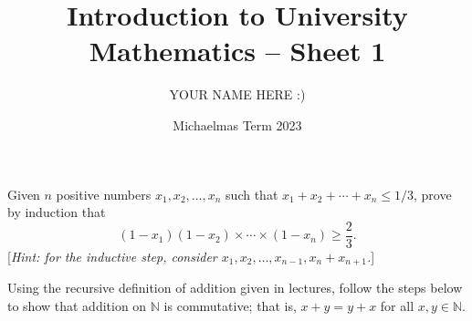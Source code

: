 \documentclass[answers]{exam}
\title{Introduction to University Mathematics -- Sheet 1}
\author{YOUR NAME HERE :)}
\date{Michaelmas Term 2023}
\begin{document}
\maketitle
\begin{questions}

\question%
Given $n$ positive numbers $x_{1}, x_{2}, \ldots, x_{n}$ such that $x_{1}+x_{2}+\cdots+x_{n} \leqslant 1 / 3$, prove by induction that \[
	(1-x_1)(1-x_2)\times\cdots\times(1-x_n)\geqslant\frac23.
\] [\emph{Hint: for the inductive step, consider $x_{1}, x_{2}, \ldots, x_{n-1}, x_{n}+x_{n+1}$.}]



\question%
Using the recursive definition of addition given in lectures, follow the steps below to show that addition on $\mathbb{N}$ is commutative; that is, $x+y=y+x$ for all $x, y \in \mathbb{N}$.



\question%




\end{questions}
\end{document}
